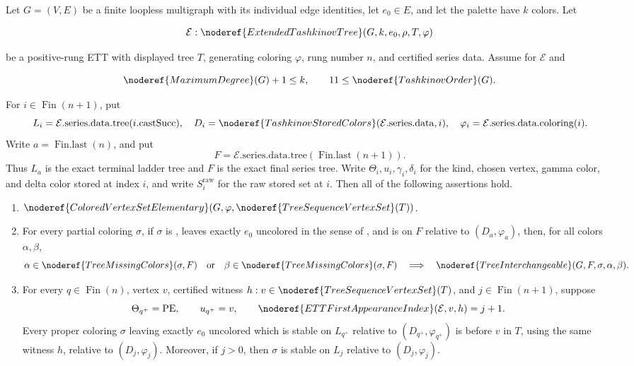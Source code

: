 \begin{theorem}
Let \(G=(V,E)\) be a finite loopless multigraph with its individual edge
identities, let \(e_0\in E\), and let the palette have \(k\) colors.  Let

\[
 \mathcal E:\noderef{ExtendedTashkinovTree}(G,k,e_0,\rho,T,\varphi)
\]

be a positive-rung ETT with displayed tree \(T\), generating coloring
\(\varphi\), rung number \(n\), and certified series data.  Assume
 for \(\mathcal E\) and

\[
 \noderef{MaximumDegree}(G)+1\leq k,
 \qquad 11\leq\noderef{TashkinovOrder}(G).
\]

For \(i\in\operatorname{Fin}(n+1)\), put
\[
 L_i=\mathcal E.\mathrm{series.data.tree}(i.\mathrm{castSucc}),\quad
 D_i=\noderef{TashkinovStoredColors}
        (\mathcal E.\mathrm{series.data},i),\quad
 \varphi_i=\mathcal E.\mathrm{series.data.coloring}(i).
\]
Write \(a=\operatorname{Fin.last}(n)\), and put
\[
 F=\mathcal E.\mathrm{series.data.tree}
       (\operatorname{Fin.last}(n+1)).
\]
Thus \(L_a\) is the exact terminal ladder tree and \(F\) is the exact final
series tree.  Write \(\Theta_i,u_i,\gamma_i,\delta_i\) for the kind, chosen
vertex, gamma color, and delta color stored at index \(i\), and write
\(S_i^{\mathrm{raw}}\) for the raw stored set at \(i\).  Then all of the
following assertions hold.

\begin{enumerate}
\item[(i)]
\(\noderef{ColoredVertexSetElementary}
  (G,\varphi,\noderef{TreeSequenceVertexSet}(T))\).

\item[(ii)]
For every partial coloring \(\sigma\), if \(\sigma\) is
, leaves exactly \(e_0\) uncolored in the
sense of , and is
 on \(F\) relative to \((D_a,\varphi_a)\), then,
for all colors \(\alpha,\beta\),
\[
 \alpha\in\noderef{TreeMissingColors}(\sigma,F)
 \quad\hbox{or}\quad
 \beta\in\noderef{TreeMissingColors}(\sigma,F)
 \quad\Longrightarrow\quad
 \noderef{TreeInterchangeable}(G,F,\sigma,\alpha,\beta).
\]

\item[(iii)]
For every \(q\in\operatorname{Fin}(n)\), vertex \(v\), certified witness
\(h:v\in\noderef{TreeSequenceVertexSet}(T)\), and
\(j\in\operatorname{Fin}(n+1)\), suppose
\[
 \Theta_{q^+}=\mathrm{PE},\qquad u_{q^+}=v,\qquad
 \noderef{ETTFirstAppearanceIndex}(\mathcal E,v,h)=j+1.
\]
Every proper coloring \(\sigma\) leaving exactly \(e_0\) uncolored which is
stable on \(L_{q^+}\) relative to \((D_{q^+},\varphi_{q^+})\) is
 before \(v\) in \(T\), using the same
witness \(h\), relative to \((D_j,\varphi_j)\).  Moreover, if \(j>0\),
then \(\sigma\) is stable on \(L_j\) relative to
\((D_j,\varphi_j)\).


\end{enumerate}
\end{theorem}
